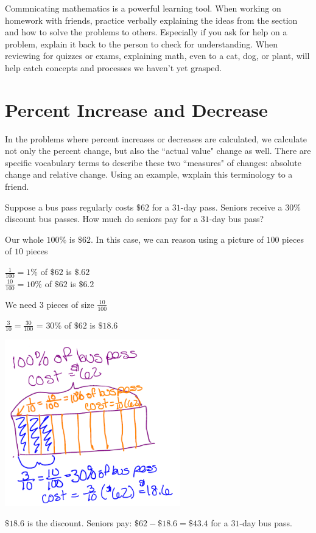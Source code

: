 \documentclass{ximera}
\begin{document}
\begin{MM}
Commnicating mathematics is a powerful learning tool.  When working on homework with friends, practice verbally explaining the ideas from the section and how to solve the problems to others.  Especially if you ask for help on a problem, explain it back to the person to check for understanding. When reviewing for quizzes or exams, explaining math, even  to a cat, dog, or plant, will help catch concepts and processes we haven't yet grasped.  
\end{MM}

\section{Percent Increase and Decrease}


\begin{example}
In the problems where percent increases or decreases are calculated, we calculate not only the percent change, but also the ``actual value" change as well.  There are specific vocabulary terms to describe these two ``measures" of changes: absolute change and relative change. Using an example, wxplain this terminology to a friend.
\begin{explanation}
Suppose a bus pass regularly costs $\$62$ for a $31$-day pass. Seniors receive a $30\%$ discount bus passes. How much do seniors pay for a $31$-day bus pass?

Our whole $100\%$ is $\$62$. In this case, we can reason using a picture of $100$ pieces of $10$ pieces\\
\begin{center}$\frac{1}{100} = 1\%$ of $\$62$ is $\$.62$\\
$\frac{10}{100} = 10\%$ of $\$62$ is $\$6.2$\\ \end{center}

We need $3$ pieces of size $\frac{10}{100}$ 

\begin{center} $\frac{3}{10} = \frac{30}{100}$ = $30\%$ of $\$62$ is $\$18.6$ \end{center}

\begin{image}
    \includegraphics[width=3in]{percentpic.png}
\end{image}

$\$18.6$ is the discount.  Seniors pay: $\$62 - \$18.6 = \$43.4$ for a $31$-day bus pass.
\end{explanation}
\end{example}
\end{document}

